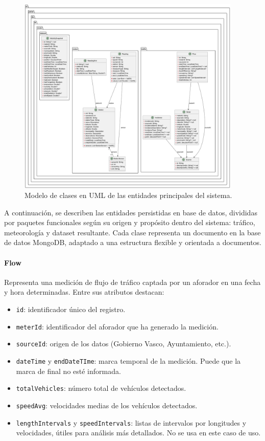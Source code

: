 \begin{figure}[H]
	\centering
	\includegraphics[width=0.95\textwidth]{includes/model_classes.png}
	\caption{Modelo de clases en UML de las entidades principales del sistema.}
	\label{fig:uml_classes}
\end{figure}

A continuación, se describen las entidades persistidas en base de datos, divididas por paquetes funcionales según su origen y propósito dentro del sistema: tráfico, meteorología y dataset resultante. Cada clase representa un documento en la base de datos MongoDB, adaptado a una estructura flexible y orientada a documentos.

\paragraph{Flow}
Representa una medición de flujo de tráfico captada por un aforador en una fecha y hora determinadas. Entre sus atributos destacan:
\begin{itemize}
	\item \texttt{id}: identificador único del registro.
	\item \texttt{meterId}: identificador del aforador que ha generado la medición.
	\item \texttt{sourceId}: origen de los datos (Gobierno Vasco, Ayuntamiento, etc.).
	\item \texttt{dateTime} y \texttt{endDateTIme}: marca temporal de la medición. Puede que la marca de final no esté informada.
	\item \texttt{totalVehicles}: número total de vehículos detectados.
	\item \texttt{speedAvg}: velocidades medias de los vehículos detectados.
	\item \texttt{lengthIntervals} y \texttt{speedIntervals}: listas de intervalos por longitudes y velocidades, útiles para análisis más detallados. No se usa en este caso de uso.
\end{itemize}

